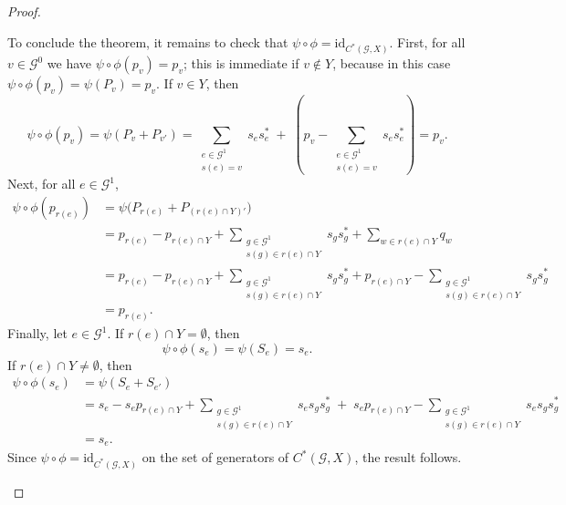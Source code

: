 \documentclass[12pt, reqno]{amsart}
\theoremstyle{definition}
\theoremstyle{remark}
\numberwithin{equation}{section}
\newcommand{\G}{\mathcal{G}}
\begin{document}
\begin{proof}
\begin{enumerate}
To conclude the theorem, it remains to check that $\psi \circ \phi = \mathrm{id}_{C^*(\mathcal{G},X)}$.
First, for all $v \in \mathcal{G}^0$ we have $\psi \circ \phi(p_v) = p_v$; this is immediate if
$v \notin Y$, because in this case $\psi \circ \phi(p_v) = \psi(P_v) = p_v$. If $v \in Y$, then
\[
\psi \circ \phi(p_v)
=
\psi(P_v + P_{v'})
=
\sum_{\substack{e \in \mathcal{G}^1 \\ s(e) = v}} s_e s_e^*
\;+\;
\left( p_v - \sum_{\substack{e \in \mathcal{G}^1 \\ s(e) = v}} s_e s_e^* \right)
=
p_v.
\]
Next, for all $e \in \mathcal{G}^1$,
\begin{align*}
\psi \circ \phi(p_{r(e)})
&= \psi\big( P_{r(e)} + P_{(r(e) \cap Y)'} \big) \\
&= p_{r(e)} - p_{r(e) \cap Y}
+ \sum_{\substack{g \in \mathcal{G}^1 \\ s(g) \in r(e) \cap Y}} s_g s_g^*
+ \sum_{w \in r(e) \cap Y} q_w \\
&= p_{r(e)} - p_{r(e) \cap Y}
+ \sum_{\substack{g \in \mathcal{G}^1 \\ s(g) \in r(e) \cap Y}} s_g s_g^*
+ p_{r(e) \cap Y}
- \sum_{\substack{g \in \mathcal{G}^1 \\ s(g) \in r(e) \cap Y}} s_g s_g^* \\
&= p_{r(e)}.
\end{align*}
Finally, let $e \in \mathcal{G}^1$. If $r(e) \cap Y = \emptyset$, then
\[
\psi \circ \phi(s_e) = \psi(S_e) = s_e.
\]
If $r(e) \cap Y \neq \emptyset$, then
\begin{align*}
\psi \circ \phi(s_e)
&= \psi(S_e + S_{e'}) \\
&= s_e - s_e p_{r(e) \cap Y}
+ \sum_{\substack{g \in \mathcal{G}^1 \\ s(g) \in r(e) \cap Y}} s_e s_g s_g^*
\;+\;
s_e p_{r(e) \cap Y}
- \sum_{\substack{g \in \mathcal{G}^1 \\ s(g) \in r(e) \cap Y}} s_e s_g s_g^* \\
&= s_e.
\end{align*}
Since $\psi \circ \phi = \mathrm{id}_{C^*(\mathcal{G},X)}$ on the set of generators of
$C^*(\mathcal{G},X)$, the result follows.
\end{enumerate}
\end{proof}



\end{document}
